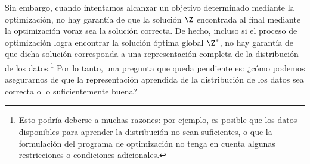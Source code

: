 \documentclass[../../book-main_es.tex]{subfiles}
\begin{document}

Sin embargo, cuando intentamos alcanzar un objetivo determinado mediante
la optimización, no hay garantía de que la solución $\Z$ encontrada
al final mediante la optimización voraz sea la solución correcta. De hecho, incluso si
el proceso de optimización logra encontrar la solución óptima global
$\Z^*$, no hay garantía de que dicha solución corresponda
a una representación completa de la distribución de los datos.\footnote{Esto
    podría deberse a muchas razones: por ejemplo, es posible que los datos disponibles para
    aprender la distribución no sean suficientes, o que la formulación
    del programa de optimización no tenga en cuenta algunas restricciones
o condiciones adicionales.} Por lo tanto, una pregunta que queda pendiente es:
¿cómo podemos asegurarnos de que la representación aprendida de la distribución de los datos sea
correcta o lo suficientemente buena?
\end{document}
